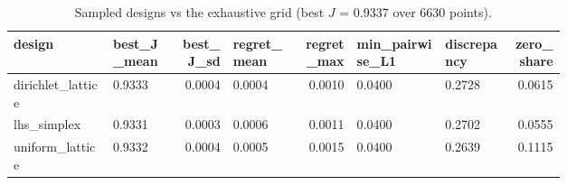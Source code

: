 \begin{table}[htbp]
\centering\tiny
\caption{Sampled designs vs the exhaustive grid (best $J$ = 0.9337 over 6630 points).}
\label{tab:designs_summary}
\setlength{\tabcolsep}{3pt}
\begin{tabular}{p{0.185\linewidth}p{0.120\linewidth}rp{0.120\linewidth}rp{0.163\linewidth}p{0.120\linewidth}r}
\toprule
design & best\_\allowbreak{}J\_\allowbreak{}mean & best\_\allowbreak{}J\_\allowbreak{}sd & regret\_\allowbreak{}mean & regret\_\allowbreak{}max & min\_\allowbreak{}pairwise\_\allowbreak{}L1 & discrepancy & zero\_\allowbreak{}share \\
\midrule
dirichlet\_\allowbreak{}lattice & 0.9333 & 0.0004 & 0.0004 & 0.0010 & 0.0400 & 0.2728 & 0.0615 \\
lhs\_\allowbreak{}simplex & 0.9331 & 0.0003 & 0.0006 & 0.0011 & 0.0400 & 0.2702 & 0.0555 \\
uniform\_\allowbreak{}lattice & 0.9332 & 0.0004 & 0.0005 & 0.0015 & 0.0400 & 0.2639 & 0.1115 \\
\bottomrule
\end{tabular}
\end{table}
